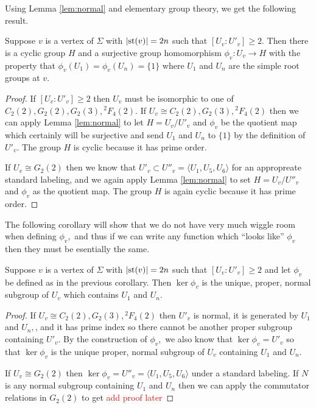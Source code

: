 \documentclass[class=book, crop=false,12 pt]{standalone}
\begin{document}
Using Lemma \ref{lem:normal} and elementary group theory, we get the following result.
\begin{cor}
	\label{cor:phiv}
	Suppose $v$ is a vertex of $\Sigma$ with $|\mathrm{st}(v)|=2n$ such that $[U_v:U'_v]\ge 2.$ Then there is a cyclic group $H$ and a surjective group homomorphism $\phi_v:U_v\to H$ with the property that $\phi_v(U_1)=\phi_v(U_n)=\{1\}$ where $U_1$ and $U_n$ are the simple root groups at $v.$
\end{cor}
\begin{proof}
	If $[U_v:U'_v]\ge 2$ then $U_v$ must be isomorphic to one of $C_2(2),G_2(2),G_2(3),{}^2F_4(2).$ If $U_v\cong C_2(2),G_2(3),{}^2F_4(2)$ then we can apply Lemma \ref{lem:normal} to let $H=U_v/U'_v$ and $\phi_v$ be the quotient map which certainly will be surjective and send $U_1$ and $U_n$ to $\{1\}$ by the definition of $U'_v.$ The group $H$ is cyclic because it has prime order.

	If $U_v\cong G_2(2)$ then we know that $U'_v\subset U''_v=\langle U_1,U_5,U_6\rangle$ for an appropreate standard labeling, and we again apply Lemma \ref{lem:normal} to set $H=U_v/U''_v$ and $\phi_v$ as the quotient map. The group $H$ is again cyclic because it has prime order.
\end{proof}

The following corollary will show that we do not have very much wiggle room when defining $\phi_v,$ and thus if we can write any function which ``looks like'' $\phi_v$ then they must be esentially the same.
\begin{cor}
	\label{cor:uniquephiv}
	Suppose $v$ is a vertex of $\Sigma$ with $|\mathrm{st}(v)|=2n$ such that $[U_v:U'_v]\ge 2$ and let $\phi_v$ be defined as in the previous corollary. Then $\ker \phi_v$ is the unique, proper, normal subgroup of $U_v$ which contains $U_1$ and $U_n.$
\end{cor}
\begin{proof}
	If $U_v\cong C_2(2),G_2(3),{}^2F_4(2)$ then $U'_v$ is normal, it is generated by $U_1$ and $U_n,$, and it has prime index so there cannot be another proper subgroup containing $U'_v.$ By the construction of $\phi_v,$ we also know that $\ker \phi_v=U'_v$ so that $\ker\phi_v$ is the unique proper, normal subgroup of $U_v$ containing $U_1$ and $U_n.$

	If $U_v\cong G_2(2)$ then $\ker \phi_v=U''_v=\langle U_1,U_5,U_6\rangle$ under a standard labeling. If $N$ is any normal subgroup containing $U_1$ and $U_n$ then we can apply the commutator relations in $G_2(2)$ to get \textcolor{red}{\Huge add proof later\normalsize}
\end{proof}
\end{document}
